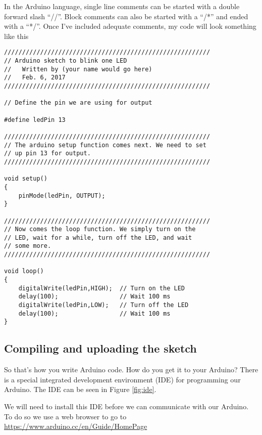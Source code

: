 In the Arduino language, single line comments can be started with a double
forward slash ``//''. Block comments can also be started with a ``/*'' and 
ended with a ``*/''.
Once I've included adequate comments, my code will look something like this
\begin{lstlisting}[language=Arduino] 
/////////////////////////////////////////////////////////
// Arduino sketch to blink one LED
//   Written by (your name would go here)
//   Feb. 6, 2017 
/////////////////////////////////////////////////////////

// Define the pin we are using for output

#define ledPin 13

/////////////////////////////////////////////////////////
// The arduino setup function comes next. We need to set
// up pin 13 for output. 
/////////////////////////////////////////////////////////

void setup() 
{
    pinMode(ledPin, OUTPUT);
}

/////////////////////////////////////////////////////////
// Now comes the loop function. We simply turn on the 
// LED, wait for a while, turn off the LED, and wait 
// some more.
/////////////////////////////////////////////////////////

void loop() 
{
    digitalWrite(ledPin,HIGH);  // Turn on the LED
    delay(100);                 // Wait 100 ms
    digitalWrite(ledPin,LOW);   // Turn off the LED
    delay(100);                 // Wait 100 ms
}
\end{lstlisting}

\subsection{Compiling and uploading the sketch}

So that's how you write Arduino code. How do you get it to your Arduino? 
There is a special integrated development environment (IDE) for 
programming our Arduino. The IDE can be seen in Figure \ref{fig:ide}.

We will need to install this IDE before we can communicate with our 
Arduino. To do so we use a web browser to go to\\

\href{https://www.arduino.cc/en/Guide/HomePage}{https://www.arduino.cc/en/Guide/HomePage}\\

